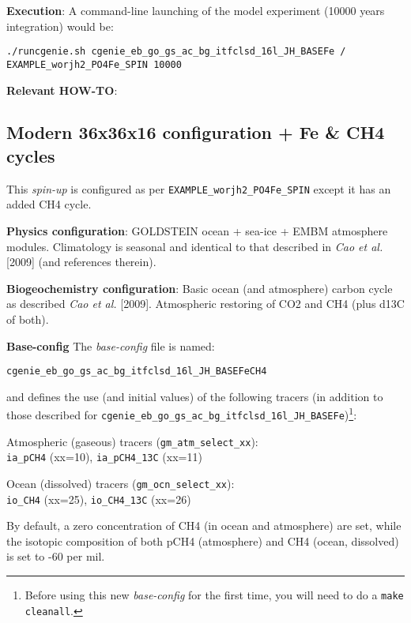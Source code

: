 \documentclass[10pt,twoside]{article}
\begin{document}
\noindent \textbf{Execution}: A command-line launching of the model experiment (10000 years integration) would be:
\vspace{-10pt}\begin{verbatim}./runcgenie.sh cgenie_eb_go_gs_ac_bg_itfclsd_16l_JH_BASEFe /
EXAMPLE_worjh2_PO4Fe_SPIN 10000\end{verbatim}\vspace{-5pt}

\noindent \textbf{Relevant HOW-TO}: 



\subsection{Modern 36x36x16 configuration + Fe \& CH4 cycles}\label{EXAMPLE_worjh2_PO4Fe_CH4_SPIN}

This \textit{spin-up} is configured as per \texttt{EXAMPLE\_worjh2\_PO4Fe\_SPIN} except it has an added CH4 cycle.

\noindent \textbf{Physics configuration}: GOLDSTEIN ocean + sea-ice + EMBM atmosphere modules. Climatology is seasonal and identical to that described in \textit{Cao et al.} [2009] (and references therein).

\noindent \textbf{Biogeochemistry configuration}: Basic ocean (and atmosphere) carbon cycle as described \textit{Cao et al.} [2009]. Atmospheric restoring of CO2 and CH4 (plus d13C of both).

\noindent \textbf{Base-config} The \textit{base-config} file is named:
\vspace{-10pt}\begin{verbatim}cgenie_eb_go_gs_ac_bg_itfclsd_16l_JH_BASEFeCH4\end{verbatim}\vspace{-10pt}
and defines the use (and initial values) of the following tracers (in addition to those described for \texttt{cgenie\_eb\_go\_gs\_ac\_bg\_itfclsd\_16l\_JH\_BASEFe})\footnote{Before using this new \textit{base-config} for the first time, you will need to do a \texttt{make cleanall}.}:
\begin{compactenum}
	
	\item Atmospheric (gaseous) tracers (\texttt{gm\_atm\_select\_xx}):
	\\\texttt{ia\_pCH4} (xx=10), \texttt{ia\_pCH4\_13C} (xx=11)
	\item Ocean (dissolved) tracers (\texttt{gm\_ocn\_select\_xx}):
	\\\texttt{io\_CH4} (xx=25), \texttt{io\_CH4\_13C} (xx=26)
		
\end{compactenum}
By default, a zero concentration of CH4 (in ocean and atmosphere) are set, while the isotopic composition of both pCH4 (atmosphere) and CH4 (ocean, dissolved) is set to -60 per mil.
\end{document}
